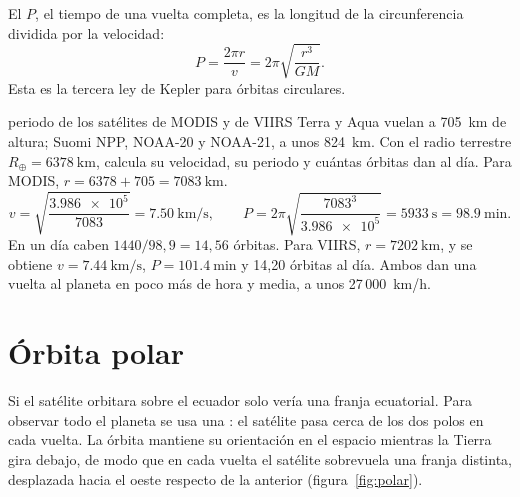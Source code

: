 El  $P$, el tiempo de una vuelta completa, es la longitud de la circunferencia
dividida por la velocidad:
\begin{equation}\label{eq:periodo}
  P = \frac{2\pi r}{v} = 2\pi\sqrt{\frac{r^3}{GM}} .
\end{equation}
Esta es la tercera ley de Kepler para órbitas circulares.

\begin{ejemplo}{periodo de los satélites de MODIS y de VIIRS}
Terra y Aqua vuelan a 705~km de altura; Suomi NPP, NOAA-20 y NOAA-21, a unos 824~km. Con el
radio terrestre $R_\oplus = \SI{6378}{\kilo\metre}$, calcula su velocidad, su periodo y cuántas
órbitas dan al día.
\solucion Para MODIS, $r = 6378 + 705 = \SI{7083}{\kilo\metre}$.
\[
 v = \sqrt{\frac{\num{3.986e5}}{7083}} = \SI{7.50}{\kilo\metre\per\second},\qquad
 P = 2\pi\sqrt{\frac{7083^3}{\num{3.986e5}}} = \SI{5933}{\second} = \SI{98.9}{\minute}.
\]
En un día caben $1440/98{,}9 = 14{,}56$ órbitas. Para VIIRS, $r = \SI{7202}{\kilo\metre}$, y se
obtiene $v = \SI{7.44}{\kilo\metre\per\second}$, $P = \SI{101.4}{\minute}$ y 14,20 órbitas al
día. Ambos dan una vuelta al planeta en poco más de hora y media, a unos 27\,000~km/h.
\end{ejemplo}

\section{Órbita polar}

Si el satélite orbitara sobre el ecuador solo vería una franja ecuatorial. Para observar todo el
planeta se usa una : el satélite pasa cerca de los dos polos en cada
vuelta. La órbita mantiene su orientación en el espacio mientras la Tierra gira debajo, de modo
que en cada vuelta el satélite sobrevuela una franja distinta, desplazada hacia el oeste respecto
de la anterior (figura~\ref{fig:polar}).

